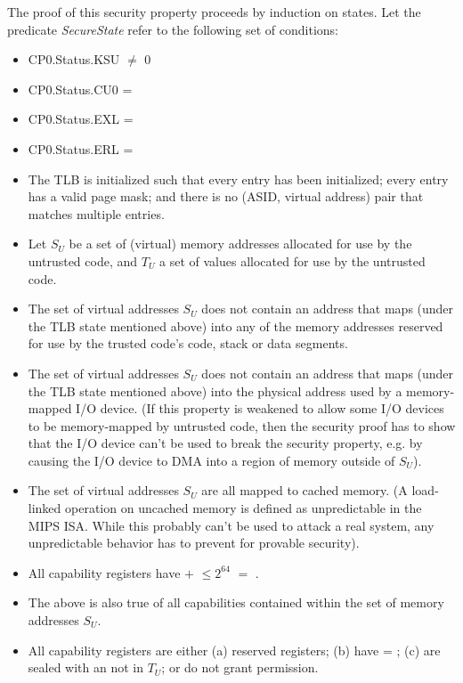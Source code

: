 The proof of this security property proceeds by induction on states. Let the
predicate \emph{SecureState} refer to the following set of conditions:

\begin{itemize}
\item
CP0.Status.KSU $\neq$ 0
\item
CP0.Status.CU0 = \algorithmicfalse{}
\item
CP0.Status.EXL = \algorithmicfalse{}
\item
CP0.Status.ERL = \algorithmicfalse{}
\item
The TLB is initialized such that every entry has been initialized; every entry has
a valid page mask; and there is no (ASID, virtual address) pair that matches multiple
entries.
\item
Let $S_U$ be a set of (virtual) memory addresses allocated for use by the untrusted code,
and $T_U$ a set of \cotype{} values allocated for use by the untrusted code.
\item
The set of virtual addresses $S_U$ does not contain an address that maps (under the
TLB state mentioned above) into any of the memory addresses reserved for use
by the trusted code's code, stack or data segments.
\item
The set of virtual addresses $S_U$ does not contain an address that maps (under the
TLB state mentioned above) into the physical address used by a memory-mapped I/O
device. (If this property is weakened to allow some I/O devices to be memory-mapped
by untrusted code, then the security proof has to show that the I/O device can't
be used to break the security property, e.g. by causing the I/O device to DMA
into a region of memory outside of $S_U$).
\item
The set of virtual addresses $S_U$ are all mapped to cached memory. (A load-linked
operation on uncached memory is defined as unpredictable in the MIPS ISA. While
this probably can't be used to attack a real system, any unpredictable behavior
has to prevent for provable security).
\item
All capability registers have \cbase{} $+$ \clength{} $\leq 2^{64}$ 
\algorithmicor{} \ctag{} $=$ \algorithmicfalse{}.
\item
The above is also true of all capabilities contained within the set of memory
addresses $S_U$.
\item
All capability registers are either (a) reserved registers; (b) have \ctag{} =
\algorithmicfalse{}; (c) are sealed with an \cotype{} not in $T_U$; or do not
grant \cappermASR* permission.

\end{itemize}
